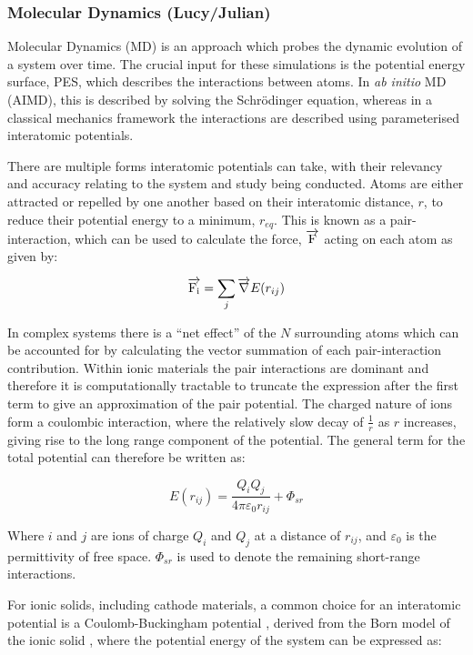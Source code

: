 \documentclass[../main.tex]{subfiles}
\begin{document}
\subsubsection{Molecular Dynamics (Lucy/Julian)}
\label{sec:molecular_dynamics}
Molecular Dynamics (MD) is an approach which probes the dynamic evolution of a system over time. The crucial input for these simulations is the potential energy surface, PES, which describes the interactions between atoms. In \textit{ab initio} MD (AIMD), this is described by solving the Schr\"{o}dinger equation, whereas in a classical mechanics framework the interactions are described using parameterised interatomic potentials.

There are multiple forms interatomic potentials can take, with their relevancy and accuracy relating to the system and study being conducted. Atoms are either attracted or repelled by one another based on their interatomic distance, $r$, to reduce their potential energy to a minimum, $r_{eq}$. This is known as a pair-interaction, which can be used to calculate the force, $\overrightarrow{\rm F}$ acting on each atom as given by:

\begin{equation}
    \overrightarrow{\rm F_i} = \sum_j {\overrightarrow{\nabla}}E(r_{ij})
\end{equation}

In complex systems there is a ``net effect'' of the $N$ surrounding atoms which can be accounted for by calculating the vector summation of each pair-interaction contribution. Within ionic materials the pair interactions are dominant and therefore it is computationally tractable to truncate the expression after the first term \cite{harding_computer_1990} to give an approximation of the pair potential. The charged nature of ions form a coulombic interaction, where the relatively slow decay of $\frac{1}{r}$ as $r$ increases, giving rise to the long range component of the potential. The general term for the total potential can therefore be written as:

\begin{equation}
    E(r_{ij}) = \frac{Q_i Q_j}{4\pi \varepsilon_0 r_{ij}} + \Phi_{sr}
\end{equation}

Where $i$ and $j$ are ions of charge $Q_i$ and $Q_j$ at a distance of $r_{ij}$, and $\varepsilon_0$ is the permittivity of free space. $\Phi_{sr}$ is used to denote the remaining short-range interactions.

For ionic solids, including cathode materials, a common choice for an interatomic potential is a Coulomb-Buckingham potential \cite{buckingham_classical_1938}, derived from the Born model of the ionic solid \cite{born_1932, mayer_1932}, where the potential energy of the system can be expressed as:
\end{document}
